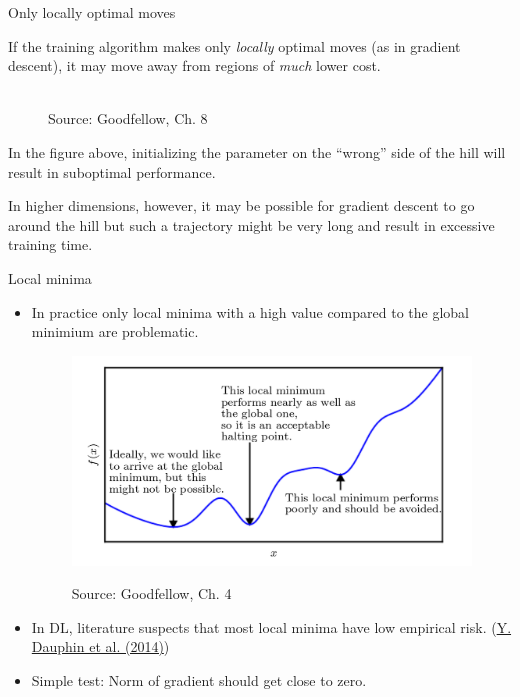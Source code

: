 \documentclass[11pt,compress,t,notes=noshow, xcolor=table]{beamer}
\begin{document}
\begin{frame} {Only locally optimal moves}
\begin{itemize}
\small{
\item If the training algorithm makes only \textit{locally} optimal moves (as in gradient descent), it may move away from regions of \textit{much} lower cost.
\begin{figure}
	\centering
	\tiny{\\Source: Goodfellow, Ch. 8}
\end{figure}
\item In the figure above, initializing the parameter on the ``wrong'' side of the hill will result in suboptimal performance.
\item In higher dimensions, however, it may be possible for gradient descent to go around the hill but such a trajectory might be very long and result in excessive training time.}
\end{itemize}
\end{frame}

\begin{vbframe} {Local minima}

\begin{itemize}
\item In practice only local minima with a high value compared to the global minimium are problematic.
\begin{figure}
\begin{center}
	\includegraphics[width=.6\textwidth]{figure_man/minima.png}
\end{center}
\tiny{Source: Goodfellow, Ch. 4}
\end{figure}
\item In DL, literature suspects that most local minima have low empirical risk. (\href{https://arxiv.org/abs/1406.2572}{Y. Dauphin et al. (2014)})
\item Simple test: Norm of gradient should get close to zero.
\end{itemize}
\end{vbframe}
\end{document}
